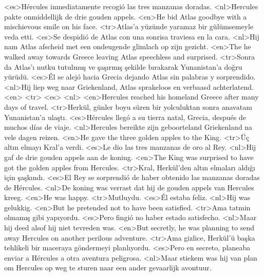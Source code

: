 <es>Hércules inmediatamente recogió las tres manzanas doradas.
<nl>Hercules pakte onmiddellijk de drie gouden appels.
<en>He bid Atlas goodbye with a mischievous smile on his face.
<tr>Atlas'a yüzünde yaramaz bir gülümsemeyle veda etti.
<es>Se despidió de Atlas con una sonrisa traviesa en la cara.
<nl>Hij nam Atlas afscheid met een ondeugende glimlach op zijn gezicht.
<en>The he walked away towards Greece leaving Atlas speechless and surprised.
<tr>Sonra da Atlas'ı nutku tutulmuş ve şaşırmış şekilde bırakarak Yunanistan'a doğru yürüdü.
<es>Él se alejó hacia Grecia dejando Atlas sin palabras y sorprendido.
<nl>Hij liep weg naar Griekenland,  Atlas sprakeloos en verbaasd achterlatend.
<en>
<tr>
<es>
<nl>
<en>Hercules reached his homeland Greece after many days of travel.
<tr>Herkül, günler boyu süren bir yolculuktan sonra anavatanı Yunanistan'a ulaştı.
<es>Hércules llegó a su tierra natal, Grecia, después de muchos días de viaje.
<nl>Hercules bereikte zijn geboorteland Griekenland na vele dagen reizen.
<en>He gave the three golden apples to the King.
<tr>Üç altın elmayı Kral'a verdi.
<es>Le dio las tres manzanas de oro al Rey.
<nl>Hij gaf de drie gouden appels aan de koning.
<en>The King was surprised to have got the golden apples from Hercules.
<tr>Kral, Herkül'den altın elmaları aldığı için şaşkındı.
<es>El Rey se sorprendió de haber obtenido las manzanas doradas de Hércules.
<nl>De koning was verrast dat hij de gouden appels van Hercules kreeg.
<en>He was happy.
<tr>Mutluydu.
<es>Él estaba feliz.
<nl>Hij was gelukkig.
<en>But he pretended not to have been satisfied.
<tr>Ama tatmin olmamış gibi yapıyordu.
<es>Pero fingió no haber estado satisfecho.
<nl>Maar hij deed alsof hij niet tevreden was.
<en>But secretly, he was planning to send away Hercules on another perilous adventure.
<tr>Ama gizlice, Herkül'ü başka tehlikeli bir maceraya göndermeyi planlıyordu.
<es>Pero en secreto, planeaba enviar a Hércules a otra aventura peligrosa.
<nl>Maar stiekem was hij van plan om Hercules op weg te sturen naar een ander gevaarlijk avontuur.
